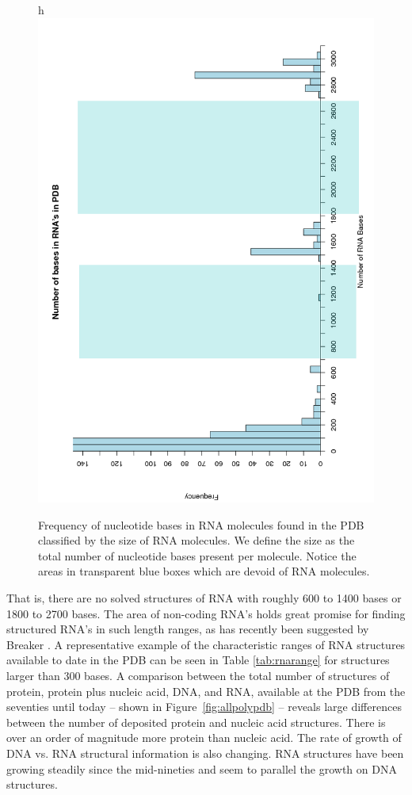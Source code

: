 \begin{figure}{h}
\centering
\includegraphics[scale=0.50, angle=-90]{Chapter2/histogram.png}
\caption{Frequency of  nucleotide bases in RNA molecules  found in the
  PDB classified by  the size of RNA molecules. We  define the size as
  the total  number of nucleotide  bases present per  molecule. Notice
  the  areas  in  transparent  blue  boxes  which  are  devoid of  RNA
  molecules.}
  \label{fig:rnaranges}
\end{figure}

That is,  there are no  solved structures of  RNA with roughly  600 to
1400 bases or 1800 to 2700  bases.  The area of non-coding RNA's holds
great promise for  finding structured RNA's in such  length ranges, as
has  recently  been   suggested  by  Breaker  \cite{weinberg2009}.   A
representative example of the  characteristic ranges of RNA structures
available to date  in the PDB can be  seen in Table \ref{tab:rnarange}
for structures larger  than 300 bases. A comparison  between the total
number of structures  of protein, protein plus nucleic  acid, DNA, and
RNA, available at  the PDB from the seventies until  today -- shown in
Figure~\ref{fig:allpolypdb}  -- reveals  large differences  between the
number  of deposited protein  and nucleic  acid structures.   There is
over an order of magnitude more protein than nucleic acid. The rate of
growth of  DNA vs.  RNA structural information  is also  changing. RNA
structures have been growing  steadily since the mid-nineties and seem
to parallel the growth on DNA structures.

